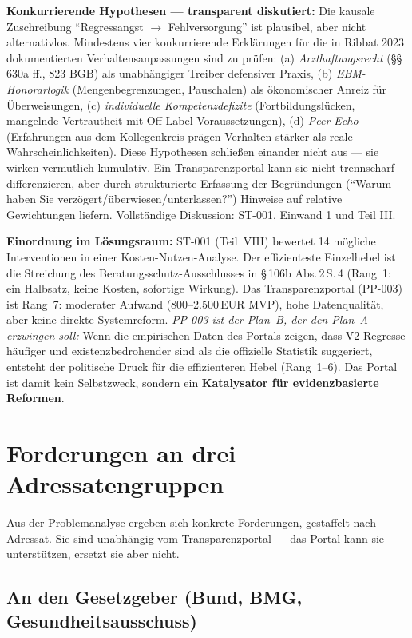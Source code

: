 \documentclass{umbruch-position}
\begin{document}
\textbf{Konkurrierende Hypothesen --- transparent diskutiert:} Die kausale Zuschreibung ``Regressangst $\to$ Fehlversorgung'' ist plausibel, aber nicht alternativlos. Mindestens vier konkurrierende Erklärungen für die in Ribbat 2023 dokumentierten Verhaltensanpassungen sind zu prüfen: (a) \textit{Arzthaftungsrecht} (\S\S\,630a ff., 823 BGB) als unabhängiger Treiber defensiver Praxis, (b) \textit{EBM-Honorarlogik} (Mengenbegrenzungen, Pauschalen) als ökonomischer Anreiz für Überweisungen, (c) \textit{individuelle Kompetenzdefizite} (Fortbildungslücken, mangelnde Vertrautheit mit Off-Label-Voraussetzungen), (d) \textit{Peer-Echo} (Erfahrungen aus dem Kollegenkreis prägen Verhalten stärker als reale Wahrscheinlichkeiten). Diese Hypothesen schließen einander nicht aus --- sie wirken vermutlich kumulativ. Ein Transparenzportal kann sie nicht trennscharf differenzieren, aber durch strukturierte Erfassung der Begründungen (``Warum haben Sie verzögert/überwiesen/unterlassen?'') Hinweise auf relative Gewichtungen liefern. Vollständige Diskussion: ST-001, Einwand 1 und Teil III.

\textbf{Einordnung im Lösungsraum:} ST-001 (Teil~VIII) bewertet 14 mögliche Interventionen in einer Kosten-Nutzen-Analyse. Der effizienteste Einzelhebel ist die Streichung des Beratungsschutz-Ausschlusses in \S\,106b Abs.\,2\,S.\,4 (Rang~1: ein Halbsatz, keine Kosten, sofortige Wirkung). Das Transparenzportal (PP-003) ist Rang~7: moderater Aufwand (800--2.500\,EUR MVP), hohe Datenqualität, aber keine direkte Systemreform. \textit{PP-003 ist der Plan~B, der den Plan~A erzwingen soll:} Wenn die empirischen Daten des Portals zeigen, dass V2-Regresse häufiger und existenzbedrohender sind als die offizielle Statistik suggeriert, entsteht der politische Druck für die effizienteren Hebel (Rang~1--6). Das Portal ist damit kein Selbstzweck, sondern ein \textbf{Katalysator für evidenzbasierte Reformen}.


\section{Forderungen an drei Adressatengruppen}
\label{sec:forderungen}

Aus der Problemanalyse ergeben sich konkrete Forderungen, gestaffelt nach Adressat. Sie sind unabhängig vom Transparenzportal --- das Portal kann sie unterstützen, ersetzt sie aber nicht.

\subsection{An den Gesetzgeber (Bund, BMG, Gesundheitsausschuss)}
\end{document}
